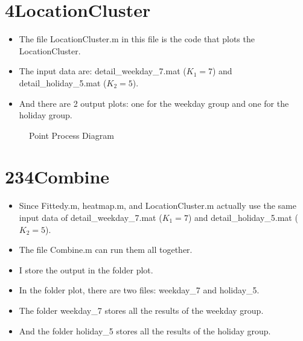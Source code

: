 \documentclass{article}
\begin{document}
\section{4LocationCluster}
\begin{itemize}
	\item The file LocationCluster.m in this file is the code that plots the LocationCluster.
	\item The input data are: detail\_weekday\_7.mat ($K_1=7$) and	detail\_holiday\_5.mat ($K_2=5$).
	\item And there are 2 output plots: one for the weekday group and one for the holiday group.
\end{itemize}
\begin{figure}[h!]
	
	\begin{center}
		\vspace{-0.3in}
		\caption{Point Process Diagram}%
	\end{center}
\end{figure}

\section{234Combine}
\begin{itemize}
	\item Since Fittedy.m, heatmap.m, and LocationCluster.m actually use the same input data of detail\_weekday\_7.mat ($K_1=7$) and	detail\_holiday\_5.mat ($K_2=5$).
	\item The file Combine.m can run them all together.
	\item I store the output in the folder plot. 
	\item In the folder plot, there are two files: weekday\_7 and holiday\_5.
	\item The folder weekday\_7 stores all the results of the weekday group.
		\item And the folder holiday\_5 stores all the results of the holiday group.
	

\end{itemize}
\end{document}
